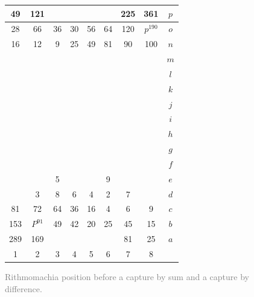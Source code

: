 \documentclass[14pt]{extarticle}
\begin{document}
\begin{figure}[H] 
\centering 
\begin{tabular}{|c|c|c|c|c|c|c|c||c} \hline
\squadfill{\,}49 & \squadfill{\,}121 & \quad  & \quad  & \quad  & \quad  & \squadfill{\,}225 & \squadfill{\,}361 & $p$ \\ \hline
\squadfill{\,}28 & \squadfill{\,}66 & \trianglepafill{\,}36 & \trianglepafill{\,}30 & \trianglepafill{\,}56 & \trianglepafill{\,}64 & \squadfill{\,}120 & \rhombusfill{\,}$p^{190}$ & $o$ \\ \hline
\trianglepafill{\,}16 & \trianglepafill{\,}12 & \circletfill{\,}9 & \circletfill{\,}25 & \circletfill{\,}49 & \circletfill{\,}81 & \trianglepafill{\,}90 & \trianglepafill{\,}100 & $n$ \\ \hline
\quad  & \quad  & \quad  & \quad  & \quad  & \quad  & \quad  & \quad  & $m$ \\ \hline
\quad  & \quad  & \quad  & \quad  & \quad  & \quad  & \quad  & \quad  & $l$ \\ \hline
\quad  & \quad  & \quad  & \quad  & \quad  & \quad  & \quad  & \quad  & $k$ \\ \hline
\quad  & \quad  & \quad  & \quad  & \quad  & \quad  & \quad  & \quad  & $j$ \\ \hline
\quad  & \quad  & \quad  & \quad  & \quad  & \quad  & \quad  & \quad  & $i$ \\ \hline
\quad  & \quad  & \quad  & \quad  & \quad  & \quad  & \quad  & \quad  & $h$ \\ \hline
\quad  & \quad  & \quad  & \quad  & \quad  & \quad  & \quad  & \quad  & $g$ \\ \hline
\quad  & \quad  & \quad  & \quad  & \quad  & \quad  & \quad  & \quad  & $f$ \\ \hline
\quad  & \quad  & \circletfill{\,}5 & \quad  & \quad  & \circletfill{\,}9 & \quad  & \quad  & $e$ \\ \hline
\quad  & \circletfill{\,}3 & \circlet{\,}8 & \circlet{\,}6 & \circlet{\,}4 & \circlet{\,}2 & \circletfill{\,}7 & \quad  & $d$ \\ \hline
\trianglepa{\,}81 & \trianglepa{\,}72 & \circlet{\,}64 & \circlet{\,}36 & \circlet{\,}16 & \circlet{\,}4 & \trianglepa{\,}6 & \trianglepa{\,}9 & $c$ \\ \hline
\squad{\,}153 & \rhombus{\,}$P^{91}$ & \trianglepa{\,}49 & \trianglepa{\,}42 & \trianglepa{\,}20 & \trianglepa{\,}25 & \squad{\,}45 & \squad{\,}15 & $b$ \\ \hline
\squad{\,}289 & \squad{\,}169 & \quad  & \quad  & \quad  & \quad  & \squad{\,}81 & \squad{\,}25 & $a$ \\ \hline
1 &  2 &  3 &  4 &  5 &  6 &  7 &  8  &  \\
\end{tabular} 
\caption{\textcolor{gray}{Rithmomachia position before a capture by sum and a capture by difference.}}
\label{fig:rithmomachia-capture-by-sum-difference-with-pyramid3} 
\end{figure}
\end{document}
